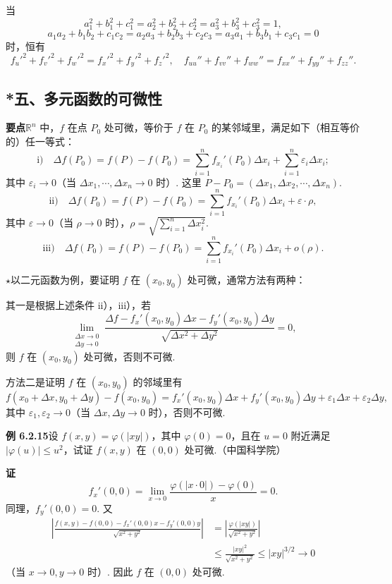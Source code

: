 \documentclass[UTF8,12pt,a4paper,fontset=fandol]{ctexart}
\begin{document}
当
\[
  a_1^2+b_1^2+c_1^2=a_2^2+b_2^2+c_2^2=a_3^2+b_3^2+c_3^2=1,
\]
\[
  a_1a_2+b_1b_2+c_1c_2=a_2a_3+b_2b_3+c_2c_3=a_3a_1+b_3b_1+c_3c_1=0
\]
时，恒有
\[
  f_u'^2+f_v'^2+f_w'^2=f_x'^2+f_y'^2+f_z'^2,\quad
  f_{uu}''+f_{vv}''+f_{ww}''=f_{xx}''+f_{yy}''+f_{zz}''.
\]

\subsection*{*五、多元函数的可微性}

\noindent\textbf{要点}\quad $\mathbb{R}^n$ 中，$f$ 在点 $P_0$ 处可微，等价于 $f$ 在 $P_0$ 的某邻域里，满足如下（相互等价的）任一等式：
\[
  \text{i)}\quad
  \Delta f(P_0)=f(P)-f(P_0)
  =\sum_{i=1}^n f_{x_i}'(P_0)\Delta x_i+\sum_{i=1}^n\varepsilon_i\Delta x_i;
\]
其中 $\varepsilon_i\to0$（当 $\Delta x_1,\cdots,\Delta x_n\to0$ 时）. 这里 $P-P_0=(\Delta x_1,\Delta x_2,\cdots,\Delta x_n)$.
\[
  \text{ii)}\quad
  \Delta f(P_0)=f(P)-f(P_0)=\sum_{i=1}^n f_{x_i}'(P_0)\Delta x_i+\varepsilon\cdot\rho,
\]
其中 $\varepsilon\to0$（当 $\rho\to0$ 时），$\rho=\sqrt{\sum_{i=1}^n\Delta x_i^2}$.
\[
  \text{iii)}\quad
  \Delta f(P_0)=f(P)-f(P_0)=\sum_{i=1}^n f_{x_i}'(P_0)\Delta x_i+o(\rho).
\]

\noindent\textbf{\ensuremath{\star}}\quad 以二元函数为例，要证明 $f$ 在 $(x_0,y_0)$ 处可微，通常方法有两种：

其一是根据上述条件 ii），iii），若
\[
  \lim_{\substack{\Delta x\to0\\ \Delta y\to0}}
  \frac{\Delta f-f_x'(x_0,y_0)\Delta x-f_y'(x_0,y_0)\Delta y}
  {\sqrt{\Delta x^2+\Delta y^2}}=0, \tag{A}
\]
则 $f$ 在 $(x_0,y_0)$ 处可微，否则不可微.

方法二是证明 $f$ 在 $(x_0,y_0)$ 的邻域里有
\[
  f(x_0+\Delta x,y_0+\Delta y)-f(x_0,y_0)
  =f_x'(x_0,y_0)\Delta x+f_y'(x_0,y_0)\Delta y+\varepsilon_1\Delta x+\varepsilon_2\Delta y,
\]
其中 $\varepsilon_1,\varepsilon_2\to0$（当 $\Delta x,\Delta y\to0$ 时），否则不可微.

\noindent\textbf{例 6.2.15}\quad 设 $f(x,y)=\varphi(|xy|)$，其中 $\varphi(0)=0$，且在 $u=0$ 附近满足 $|\varphi(u)|\le u^2$，试证 $f(x,y)$ 在 $(0,0)$ 处可微.（中国科学院）

\noindent\textbf{证}\quad
\[
  f_x'(0,0)=\lim_{x\to0}\frac{\varphi(|x\cdot0|)-\varphi(0)}{x}=0.
\]
同理，$f_y'(0,0)=0$. 又
\[
\begin{aligned}
\left|\frac{f(x,y)-f(0,0)-f_x'(0,0)x-f_y'(0,0)y}{\sqrt{x^2+y^2}}\right|
&=\left|\frac{\varphi(|xy|)}{\sqrt{x^2+y^2}}\right|\\
&\le \frac{|xy|^2}{\sqrt{x^2+y^2}}\le |xy|^{3/2}\to0
\end{aligned}
\]
（当 $x\to0,y\to0$ 时）. 因此 $f$ 在 $(0,0)$ 处可微.
\end{document}
